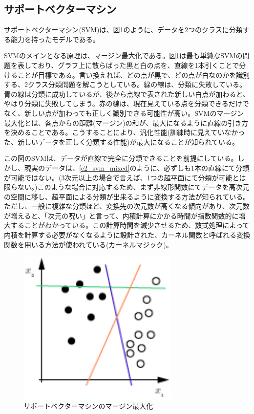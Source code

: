 
\subsection{サポートベクターマシン}
サポートベクターマシン(SVM)は、図\ref{c2_svm}のように、データを2つのクラスに分類する能力を持ったモデルである\cite{cortes1995support-vector}。\par
SVMのメインとなる原理は、マージン最大化である。図\ref{c2_svm}は最も単純なSVMの問題を表しており、グラフ上に散らばった黒と白の点を、直線を1本引くことで分けることが目標である。言い換えれば、どの点が黒で、どの点が白なのかを識別する、2クラス分類問題を解こうとしている。緑の線は、分類に失敗している。青の線は分類に成功しているが、後から点線で表された新しい白点が加わると、やはり分類に失敗してしまう。赤の線は、現在見えている点を分類できるだけでなく、新しい点が加わっても正しく識別できる可能性が高い。SVMのマージン最大化とは、各点からの距離(マージン)の和が、最大になるように直線の引き方を決めることである。こうすることにより、汎化性能(訓練時に見えていなかった、新しいデータを正しく分類する性能)が最大になることが知られている。\par
この図のSVMは、データが直線で完全に分類できることを前提にしている。しかし、現実のデータは、\ref{c2_svm_mixed}のように、必ずしも1本の直線にて分類が可能ではない。(3次元以上の場合で言えば、1つの超平面にて分類が可能とは限らない。)このような場合に対応するため、まず非線形関数にてデータを高次元の空間に移し、超平面による分類が出来るように変換する方法が知られている\cite{burges1998tutorial}。ただし、一般に複雑な分類ほど、変換先の次元数が高くなる傾向があり、次元数が増えると、「次元の呪い」と言って、内積計算にかかる時間が指数関数的に増大することがわかっている\cite{bellman1961adaptive}。この計算時間を減少させるため、数式処理によって内積を計算する必要がなくなるように設計された、カーネル関数と呼ばれる変換関数を用いる方法が使われている(カーネルマジック)。
\begin{figure}[tbp]
 \centering
  \includegraphics[width=80mm]{img/c2/svm}
 \caption{サポートベクターマシンのマージン最大化}
 \label{c2_svm}
\end{figure}
